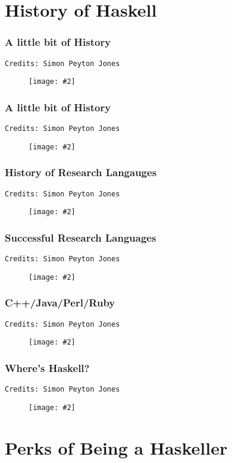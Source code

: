 \documentclass{beamer}
\newenvironment{fimage}[2][\textheight]
               { \begin{figure}
                   \centering
                   \texttt{[image: \#2]}
               }
               { \end{figure} }
\begin{document}
\section{History of Haskell}

\begin{frame}[t]
  \frametitle{A little bit of History}
  \texttt{Credits: Simon Peyton Jones}
  \begin{fimage}[18em]{beginnings} \end{fimage}
\end{frame}

\begin{frame}[t]
  \frametitle{A little bit of History}
  \texttt{Credits: Simon Peyton Jones}
  \begin{fimage}[18em]{haskell98} \end{fimage}
\end{frame}

\begin{frame}[t]
  \frametitle{History of Research Langauges}
  \texttt{Credits: Simon Peyton Jones}
  \begin{fimage}{historyResearchLang} \end{fimage}
\end{frame}

\begin{frame}[t]
  \frametitle{Successful Research Languages}
  \texttt{Credits: Simon Peyton Jones}
  \begin{fimage}{successfulRLang} \end{fimage}
\end{frame}

\begin{frame}[t]
  \frametitle{C++/Java/Perl/Ruby}
  \texttt{Credits: Simon Peyton Jones}
  \begin{fimage}{immortalLanguages} \end{fimage}
\end{frame}

\begin{frame}[t]
  \frametitle{Where's Haskell?}
  \texttt{Credits: Simon Peyton Jones}
  \begin{fimage}[18em]{haskellHistory} \end{fimage}
\end{frame}


\section{Perks of Being a Haskeller}

\begin{frame}


\end{frame}
\end{document}
